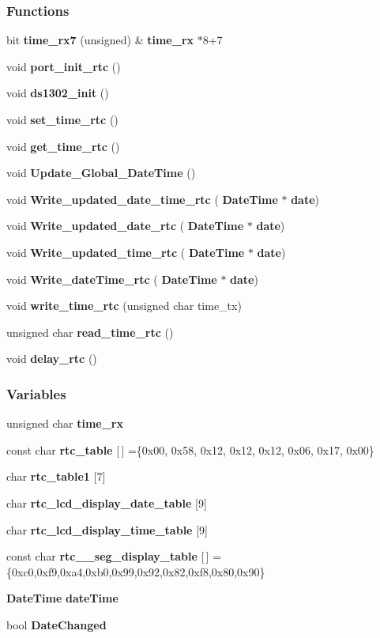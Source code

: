 \subsubsection*{Functions}
\begin{DoxyCompactItemize}
\item 
bit \textbf{ time\+\_\+rx7} (unsigned) \&\textbf{ time\+\_\+rx} $\ast$8+7
\item 
void \textbf{ port\+\_\+init\+\_\+rtc} ()
\item 
void \textbf{ ds1302\+\_\+init} ()
\item 
void \textbf{ set\+\_\+time\+\_\+rtc} ()
\item 
void \textbf{ get\+\_\+time\+\_\+rtc} ()
\item 
void \textbf{ Update\+\_\+\+Global\+\_\+\+Date\+Time} ()
\item 
void \textbf{ Write\+\_\+updated\+\_\+date\+\_\+time\+\_\+rtc} (\textbf{ Date\+Time} $\ast$\textbf{ date})
\item 
void \textbf{ Write\+\_\+updated\+\_\+date\+\_\+rtc} (\textbf{ Date\+Time} $\ast$\textbf{ date})
\item 
void \textbf{ Write\+\_\+updated\+\_\+time\+\_\+rtc} (\textbf{ Date\+Time} $\ast$\textbf{ date})
\item 
void \textbf{ Write\+\_\+date\+Time\+\_\+rtc} (\textbf{ Date\+Time} $\ast$\textbf{ date})
\item 
void \textbf{ write\+\_\+time\+\_\+rtc} (unsigned char time\+\_\+tx)
\item 
unsigned char \textbf{ read\+\_\+time\+\_\+rtc} ()
\item 
void \textbf{ delay\+\_\+rtc} ()
\end{DoxyCompactItemize}
\subsubsection*{Variables}
\begin{DoxyCompactItemize}
\item 
unsigned char \textbf{ time\+\_\+rx}
\item 
const char \textbf{ rtc\+\_\+table} [$\,$] =\{0x00, 0x58, 0x12, 0x12, 0x12, 0x06, 0x17, 0x00\}
\item 
char \textbf{ rtc\+\_\+table1} [7]
\item 
char \textbf{ rtc\+\_\+lcd\+\_\+display\+\_\+date\+\_\+table} [9]
\item 
char \textbf{ rtc\+\_\+lcd\+\_\+display\+\_\+time\+\_\+table} [9]
\item 
const char \textbf{ rtc\+\_\+\_\+seg\+\_\+display\+\_\+table} [$\,$] =\{0xc0,0xf9,0xa4,0xb0,0x99,0x92,0x82,0xf8,0x80,0x90\}
\item 
\textbf{ Date\+Time} \textbf{ date\+Time}
\item 
bool \textbf{ Date\+Changed}
\end{DoxyCompactItemize}


